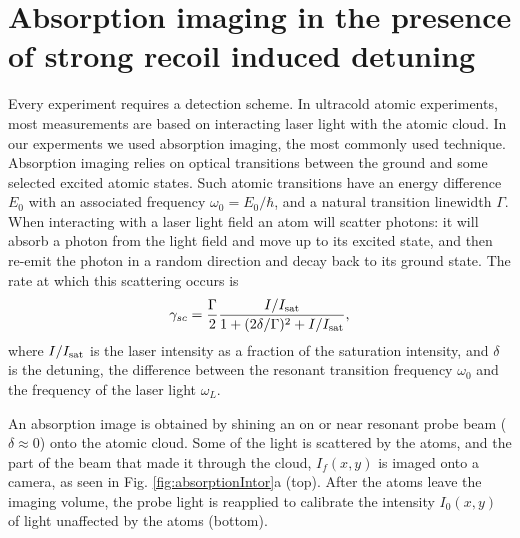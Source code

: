 \documentclass[12pt]{iopart}
\begin{document}
\section{Absorption imaging in the presence of strong recoil induced detuning}
Every experiment requires a detection scheme. In ultracold atomic experiments, most measurements are based on interacting laser light with the atomic cloud. In our experments we used absorption imaging, the most commonly used technique. Absorption imaging relies on optical transitions between the ground and some selected excited atomic states. Such atomic transitions have an energy difference $E_0$ with an associated frequency $\omega_0 = E_0/\hbar$, and a natural transition linewidth $\Gamma$. When interacting with a laser light field an atom will scatter photons: it will absorb a photon from the light field and move up to its excited state, and then re-emit the photon in a random direction and decay back to its ground state. The  rate at which this scattering occurs is
\begin{equation}
\gamma_{sc}= \frac{\Gamma}{2} \frac{I/I_{\rm{sat}}}{1+(2\delta/\Gamma)^2 +I/I_{\rm{sat}}}, 
\label{eq:scatrate}
\end{equation}
where $I/I_{\rm{sat}}$ is the laser intensity as a fraction of the saturation intensity, and $\delta$ is the detuning, the difference between the resonant transition frequency $\omega_0$ and the frequency of the laser light $\omega_L$.  
\par An absorption image is obtained by shining an on or near resonant probe beam ($\delta\approx0$) onto the atomic cloud. Some of the light is scattered by the atoms, and the part of the beam that made it through the cloud, $I_f(x,y)$ is imaged onto a camera, as seen in Fig. \ref{fig:absorptionIntor}a (top). After the atoms leave the imaging volume, the probe light is reapplied to calibrate the intensity $I_0(x,y)$ of light unaffected by the atoms (bottom). 
\end{document}

